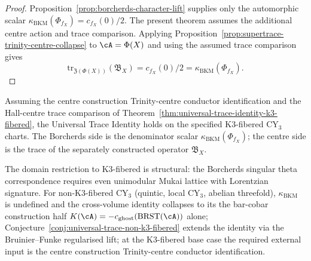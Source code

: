 \begin{proof}
Proposition~\ref{prop:borcherds-character-lift} supplies only the
automorphic scalar
\(\kappa_{\mathrm{BKM}}(\Phi_{f_X})=c_{f_X}(0)/2\).  The present theorem
assumes the additional centre action and trace comparison.  Applying
Proposition~\ref{prop:supertrace-trinity-centre-collapse} to
\(\cA=\Phi(X)\) and using the assumed trace comparison gives
\[
 \mathrm{tr}_{\mathfrak{Z}(\Phi(X))}(\mathfrak{B}_X)
 =
 c_{f_X}(0)/2
 =
 \kappa_{\mathrm{BKM}}(\Phi_{f_X}).
\]
\end{proof}

\begin{remark}
\label{rem:item-11b-complete-k3-fibered}
Assuming the centre construction Trinity-centre conductor identification
\cite{VolII} and the Hall-centre trace comparison of
Theorem~\ref{thm:universal-trace-identity-k3-fibered}, the Universal
Trace Identity holds on the specified K$3$-fibered CY$_3$ charts.  The
Borcherds side is the denominator scalar
\(\kappa_{\mathrm{BKM}}(\Phi_{f_X})\); the centre side is the trace of
the separately constructed operator \(\mathfrak B_X\).

The domain restriction to K$3$-fibered is structural: the Borcherds
singular theta correspondence requires even unimodular Mukai lattice
with Lorentzian signature. For non-K$3$-fibered CY$_3$ \textup{(}quintic,
local CY$_3$, abelian threefold\textup{),} $\kappa_{\mathrm{BKM}}$ is
undefined and the cross-volume identity collapses to its the bar-cobar construction half
$K(\cA) = -c_{\mathrm{ghost}}(\mathrm{BRST}(\cA))$ alone;
Conjecture~\ref{conj:universal-trace-non-k3-fibered} extends the
identity via the Bruinier--Funke regularised lift; at the K$3$-fibered
base case the required external input is the centre construction Trinity-centre
conductor identification.
\end{remark}

